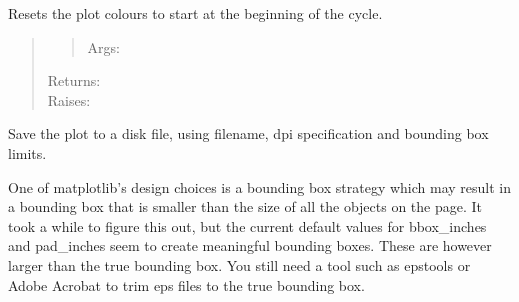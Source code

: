 \documentclass[a4paper,10pt,english]{sphinxmanual}
\begin{document}
\begin{fulllineitems}
\begin{fulllineitems}
\label{ryplot:pyradi.ryplot.Plotter.resetPlotCol}
Resets the plot colours to start at the beginning of
the cycle.
\begin{quote}
\begin{quote}
\begin{description}
\item[{Args:}] \leavevmode
{}

\end{description}
\end{quote}
\begin{description}
\item[{Returns:}] \leavevmode
{}

\item[{Raises:}] \leavevmode
{}

\end{description}
\end{quote}

\end{fulllineitems}


\begin{fulllineitems}
\label{ryplot:pyradi.ryplot.Plotter.saveFig}
Save the plot to a disk file, using filename, dpi specification and bounding box limits.

One of matplotlib's design choices is a bounding box strategy  which may result in a bounding box
that is smaller than the size of all the objects on the page.  It took a while to figure this out,
but the current default values for bbox\_inches and pad\_inches seem to create meaningful
bounding boxes. These are however larger than the true bounding box. You still need a
tool such as epstools or Adobe Acrobat to trim eps files to the true bounding box.


\end{fulllineitems}
\end{fulllineitems}
\end{document}
